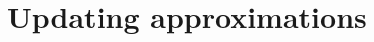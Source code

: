 \documentclass[12pt]{article}
\def\P{\mathbb{P}}
\def\E{\mathbb{E}}
\DeclareMathOperator*{\argmax}{arg\,max}
\newtheorem{prop}[theorem]{Proposition}
\begin{document}
  



\section{Updating approximations}
\label{sect.updating}
\end{document}
